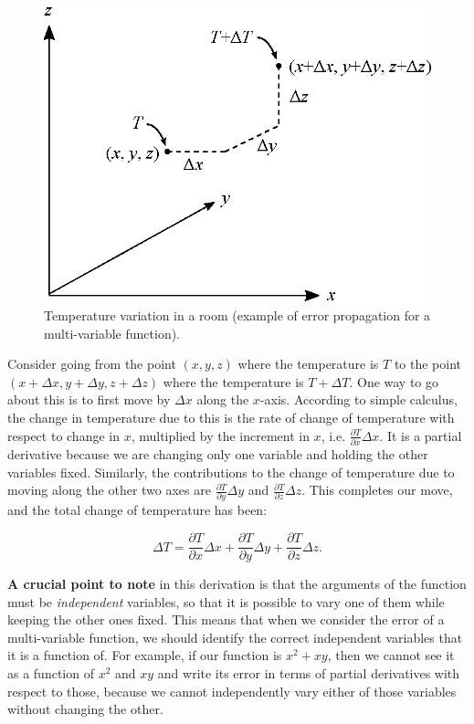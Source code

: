 \begin{figure}[!htb]
\centering
\epsfxsize=12cm \includegraphics{0_intro/temperature.eps}
\caption{Temperature variation in a room (example of error propagation for a multi-variable function).}
\label{fig:intro:temperature}
\end{figure}

Consider going from the point $(x,y,z)$ where the temperature is
$T$ to the point $(x+\Delta x,y+\Delta y,z+\Delta z)$ where the
temperature is $T+\Delta T$. One way to go about this is to first
move by $\Delta x$ along the $x$-axis. According to simple calculus,
the change in temperature due to this is the rate of change of temperature
with respect to change in $x$, multiplied by the increment in $x$,
i.e. $\frac{\partial T}{\partial x}\Delta x$. It is a partial derivative
because we are changing only one variable and holding the other variables
fixed. Similarly, the contributions to the change of temperature due
to moving along the other two axes are $\frac{\partial T}{\partial y}\Delta y$
and $\frac{\partial T}{\partial z}\Delta z$. This completes our move,
and the total change of temperature has been:

\begin{equation}
\Delta T=\frac{\partial T}{\partial x}\Delta x+\frac{\partial T}{\partial y}\Delta y+\frac{\partial T}{\partial z}\Delta z.
\label{equ:intro:temperature}
\end{equation}


\textbf{A crucial point to note} in this derivation is that the arguments of
the function must be \textit{independent} variables, so that it is
possible to vary one of them while keeping the other ones fixed. This
means that when we consider the error of a multi-variable function,
we should identify the correct independent variables that it is a
function of. For example, if our function is $x^{2}+xy$, then we
cannot see it as a function of $x^{2}$ and $xy$ and write its error
in terms of partial derivatives with respect to those, because we
cannot independently vary either of those variables without changing
the other.

